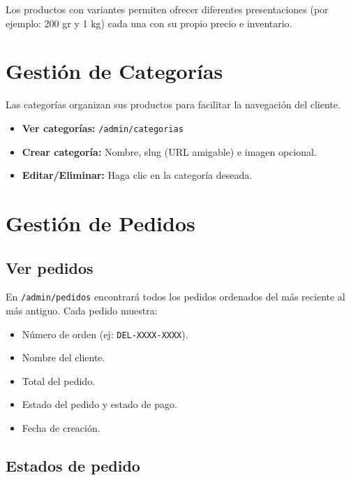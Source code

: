 \documentclass[12pt,a4paper]{article}
\begin{document}
\begin{infobox}
Los productos con variantes permiten ofrecer diferentes presentaciones (por ejemplo: 200 gr y 1 kg) cada una con su propio precio e inventario.
\end{infobox}

\section{Gestión de Categorías}

Las categorías organizan sus productos para facilitar la navegación del cliente.

\begin{itemize}[leftmargin=2cm]
    \item \textbf{Ver categorías:} \texttt{/admin/categorias}
    \item \textbf{Crear categoría:} Nombre, slug (URL amigable) e imagen opcional.
    \item \textbf{Editar/Eliminar:} Haga clic en la categoría deseada.
\end{itemize}

\section{Gestión de Pedidos}

\subsection{Ver pedidos}
En \texttt{/admin/pedidos} encontrará todos los pedidos ordenados del más reciente al más antiguo. Cada pedido muestra:

\begin{itemize}[leftmargin=2cm]
    \item Número de orden (ej: \texttt{DEL-XXXX-XXXX}).
    \item Nombre del cliente.
    \item Total del pedido.
    \item Estado del pedido y estado de pago.
    \item Fecha de creación.
\end{itemize}

\subsection{Estados de pedido}
\end{document}
